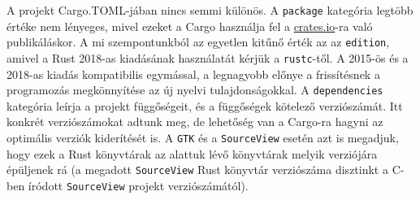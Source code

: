 


A projekt Cargo.TOML-jában nincs semmi különös.
A \texttt{package} kategória legtöbb értéke nem lényeges, mivel ezeket a Cargo használja fel
a \url{crates.io}-ra való publikáláskor.
A mi szempontunkból az egyetlen kitűnő érték az az \texttt{edition}, amivel a Rust 2018-as
kiadásának használatát kérjük a \texttt{rustc}-től.
A 2015-ös és a 2018-as kiadás kompatibilis egymással,\cite{rust:editions}
a legnagyobb előnye a frissítésnek a programozás megkönnyítése az új nyelvi tulajdonságokkal.
A \texttt{dependencies} kategória leírja a projekt függőségeit, és a függőségek kötelező verziószámát.
Itt konkrét verziószámokat adtunk meg, de lehetőség van a Cargo-ra hagyni az optimális verziók kiderítését is.
A \texttt{GTK} és a \texttt{SourceView} esetén azt is megadjuk, 
hogy ezek a Rust könyvtárak az alattuk lévő könyvtárak melyik verziójára épüljenek rá
(a megadott \texttt{SourceView} Rust könyvtár verziószáma disztinkt a C-ben íródott \texttt{SourceView}
projekt verziószámától).
